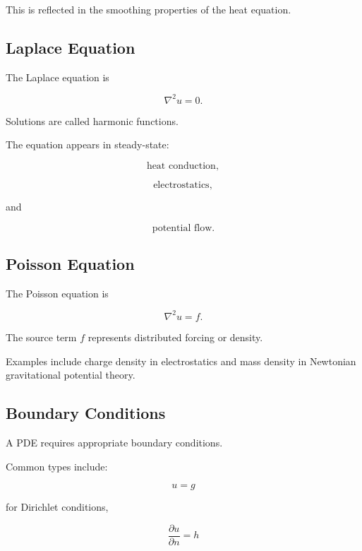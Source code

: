 This is reflected in the smoothing properties of the heat equation.

\subsection{Laplace Equation}
\label{subsec:physical-laplace-equation}

The Laplace equation is

\[
\boxed{
\nabla^2u=0.
}
\]

Solutions are called harmonic functions.

The equation appears in steady-state:

\[
\boxed{
\text{heat conduction},
}
\]

\[
\boxed{
\text{electrostatics},
}
\]

and

\[
\boxed{
\text{potential flow}.
}
\]

\subsection{Poisson Equation}
\label{subsec:physical-poisson-equation}

The Poisson equation is

\[
\boxed{
\nabla^2u=f.
}
\]

The source term \(f\) represents distributed forcing or density.

Examples include charge density in electrostatics and mass density in
Newtonian gravitational potential theory.

\subsection{Boundary Conditions}
\label{subsec:physical-boundary-conditions}

A PDE requires appropriate boundary conditions.

Common types include:

\[
\boxed{
u=g
}
\]

for Dirichlet conditions,

\[
\boxed{
\frac{\partial u}{\partial n}
=
h
}
\]

